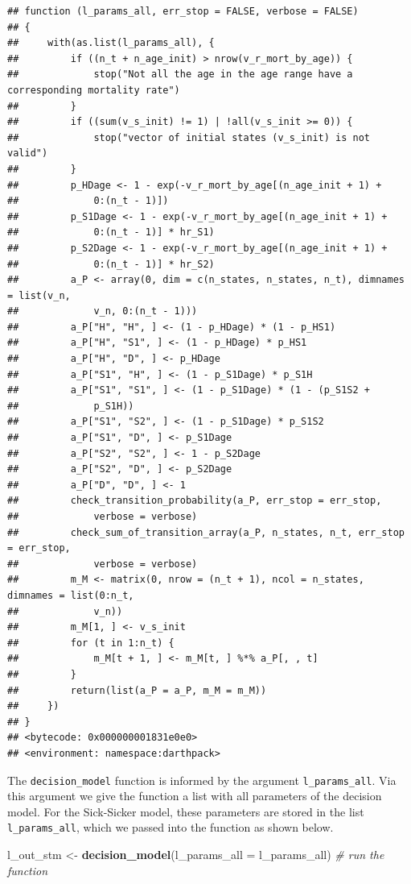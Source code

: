 \documentclass[]{book}
\newenvironment{Shaded}{\begin{snugshade}}{\end{snugshade}}
\newcommand{\CommentTok}[1]{\textcolor[rgb]{0.56,0.35,0.01}{\textit{#1}}}
\newcommand{\DataTypeTok}[1]{\textcolor[rgb]{0.13,0.29,0.53}{#1}}
\newcommand{\KeywordTok}[1]{\textcolor[rgb]{0.13,0.29,0.53}{\textbf{#1}}}
\newcommand{\NormalTok}[1]{#1}
\newcommand{\StringTok}[1]{\textcolor[rgb]{0.31,0.60,0.02}{#1}}
\begin{document}
\begin{verbatim}
## function (l_params_all, err_stop = FALSE, verbose = FALSE) 
## {
##     with(as.list(l_params_all), {
##         if ((n_t + n_age_init) > nrow(v_r_mort_by_age)) {
##             stop("Not all the age in the age range have a corresponding mortality rate")
##         }
##         if ((sum(v_s_init) != 1) | !all(v_s_init >= 0)) {
##             stop("vector of initial states (v_s_init) is not valid")
##         }
##         p_HDage <- 1 - exp(-v_r_mort_by_age[(n_age_init + 1) + 
##             0:(n_t - 1)])
##         p_S1Dage <- 1 - exp(-v_r_mort_by_age[(n_age_init + 1) + 
##             0:(n_t - 1)] * hr_S1)
##         p_S2Dage <- 1 - exp(-v_r_mort_by_age[(n_age_init + 1) + 
##             0:(n_t - 1)] * hr_S2)
##         a_P <- array(0, dim = c(n_states, n_states, n_t), dimnames = list(v_n, 
##             v_n, 0:(n_t - 1)))
##         a_P["H", "H", ] <- (1 - p_HDage) * (1 - p_HS1)
##         a_P["H", "S1", ] <- (1 - p_HDage) * p_HS1
##         a_P["H", "D", ] <- p_HDage
##         a_P["S1", "H", ] <- (1 - p_S1Dage) * p_S1H
##         a_P["S1", "S1", ] <- (1 - p_S1Dage) * (1 - (p_S1S2 + 
##             p_S1H))
##         a_P["S1", "S2", ] <- (1 - p_S1Dage) * p_S1S2
##         a_P["S1", "D", ] <- p_S1Dage
##         a_P["S2", "S2", ] <- 1 - p_S2Dage
##         a_P["S2", "D", ] <- p_S2Dage
##         a_P["D", "D", ] <- 1
##         check_transition_probability(a_P, err_stop = err_stop, 
##             verbose = verbose)
##         check_sum_of_transition_array(a_P, n_states, n_t, err_stop = err_stop, 
##             verbose = verbose)
##         m_M <- matrix(0, nrow = (n_t + 1), ncol = n_states, dimnames = list(0:n_t, 
##             v_n))
##         m_M[1, ] <- v_s_init
##         for (t in 1:n_t) {
##             m_M[t + 1, ] <- m_M[t, ] %*% a_P[, , t]
##         }
##         return(list(a_P = a_P, m_M = m_M))
##     })
## }
## <bytecode: 0x000000001831e0e0>
## <environment: namespace:darthpack>
\end{verbatim}

The \texttt{decision\_model} function is informed by the argument \texttt{l\_params\_all}. Via this argument we give the function a list with all parameters of the decision model. For the Sick-Sicker model, these parameters are stored in the list \texttt{l\_params\_all}, which we passed into the function as shown below.

\begin{Shaded}
\begin{Highlighting}[]
\NormalTok{l_out_stm <-}\StringTok{ }\KeywordTok{decision_model}\NormalTok{(}\DataTypeTok{l_params_all =}\NormalTok{ l_params_all) }\CommentTok{# run the function}
\end{Highlighting}
\end{Shaded}
\end{document}
